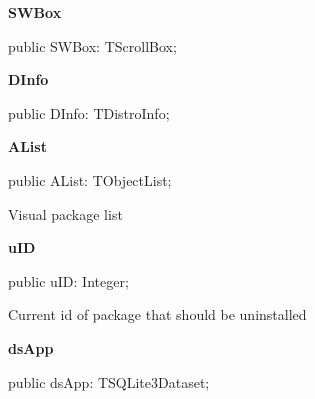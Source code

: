 \documentclass{report}
\newif\ifpdf
\begin{document}
\begin{list}{}
\begin{flushleft}
\ifpdf
\end{flushleft}
\fi


\par  \label{manager.TMnFrm-SWBox}
\item[\textbf{SWBox}\hfill]
\ifpdf
\begin{flushleft}
\fi
\begin{ttfamily}
public SWBox: TScrollBox;\end{ttfamily}

\ifpdf
\end{flushleft}
\fi


\par  \label{manager.TMnFrm-DInfo}
\item[\textbf{DInfo}\hfill]
\ifpdf
\begin{flushleft}
\fi
\begin{ttfamily}
public DInfo: TDistroInfo;\end{ttfamily}

\ifpdf
\end{flushleft}
\fi


\par  \label{manager.TMnFrm-AList}
\item[\textbf{AList}\hfill]
\ifpdf
\begin{flushleft}
\fi
\begin{ttfamily}
public AList: TObjectList;\end{ttfamily}

\ifpdf
\end{flushleft}
\fi


\par Visual package list\label{manager.TMnFrm-uID}
\item[\textbf{uID}\hfill]
\ifpdf
\begin{flushleft}
\fi
\begin{ttfamily}
public uID: Integer;\end{ttfamily}

\ifpdf
\end{flushleft}
\fi


\par Current id of package that should be uninstalled\label{manager.TMnFrm-dsApp}
\item[\textbf{dsApp}\hfill]
\ifpdf
\begin{flushleft}
\fi
\begin{ttfamily}
public dsApp: TSQLite3Dataset;\end{ttfamily}

\ifpdf
\end{flushleft}
\fi


\par  \end{list}
\end{document}
